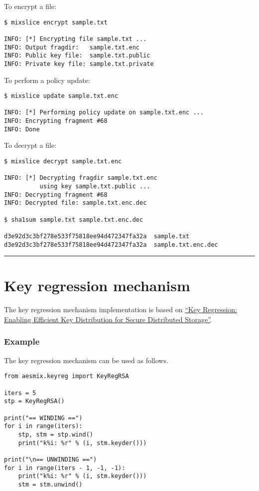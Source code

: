 To encrypt a file:

\begin{verbatim}
$ mixslice encrypt sample.txt

INFO: [*] Encrypting file sample.txt ...
INFO: Output fragdir:   sample.txt.enc
INFO: Public key file:  sample.txt.public
INFO: Private key file: sample.txt.private
\end{verbatim}

To perform a policy update:

\begin{verbatim}
$ mixslice update sample.txt.enc

INFO: [*] Performing policy update on sample.txt.enc ...
INFO: Encrypting fragment #68
INFO: Done
\end{verbatim}

To decrypt a file:

\begin{verbatim}
$ mixslice decrypt sample.txt.enc

INFO: [*] Decrypting fragdir sample.txt.enc
          using key sample.txt.public ...
INFO: Decrypting fragment #68
INFO: Decrypted file: sample.txt.enc.dec

$ sha1sum sample.txt sample.txt.enc.dec

d3e92d3c3bf278e533f75818ee94d472347fa32a  sample.txt
d3e92d3c3bf278e533f75818ee94d472347fa32a  sample.txt.enc.dec
\end{verbatim}

\begin{center}\rule{0.5\linewidth}{\linethickness}\end{center}

\section{Key regression mechanism}\label{key-regression-mechanism}

The key regression mechanism implementation is based on
\href{https://eprint.iacr.org/2005/303.pdf}{``Key Regression: Enabling
Efficient Key Distribution for Secure Distributed Storage''}.

\subsubsection{Example}

The key regression mechanism can be used as follows.

\begin{verbatim}
from aesmix.keyreg import KeyRegRSA

iters = 5
stp = KeyRegRSA()

print("== WINDING ==")
for i in range(iters):
    stp, stm = stp.wind()
    print("k%i: %r" % (i, stm.keyder()))

print("\n== UNWINDING ==")
for i in range(iters - 1, -1, -1):
    print("k%i: %r" % (i, stm.keyder()))
    stm = stm.unwind()
\end{verbatim}